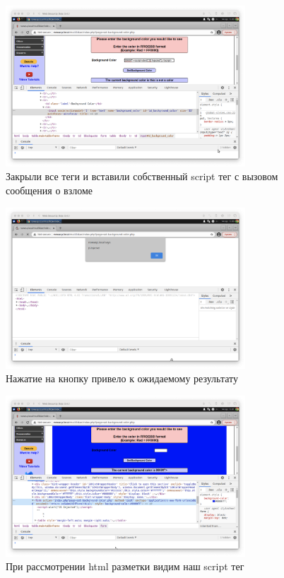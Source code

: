 \documentclass[a4paper]{article}
\begin{document}
  \begin{figure}[H]
    \centering
    \includegraphics[width=0.8\textwidth]{step_00010}
    \caption{Закрыли все теги и вставили собственный script тег с вызовом сообщения о взломе}
  \end{figure}

  \begin{figure}[H]
    \centering
    \includegraphics[width=0.8\textwidth]{step_00011}
    \caption{Нажатие на кнопку привело к ожидаемому результату}
  \end{figure}

  \begin{figure}[H]
    \centering
    \includegraphics[width=0.8\textwidth]{step_00012}
    \caption{При рассмотрении html разметки видим наш script тег}
  \end{figure}
\end{document}
